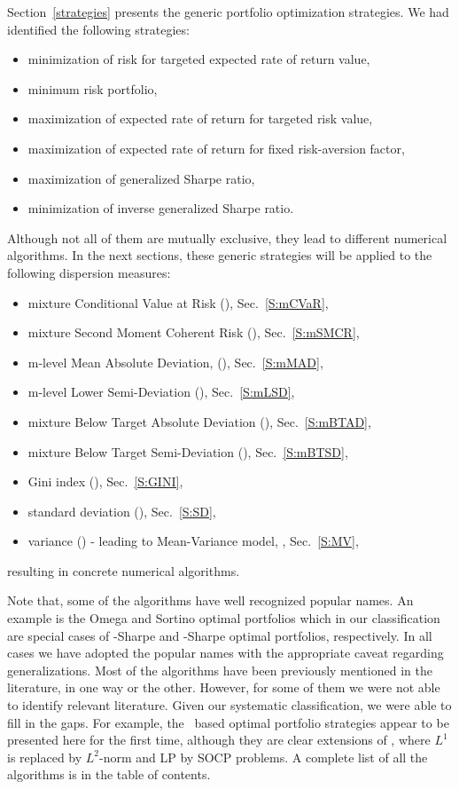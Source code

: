 Section~\ref{strategies} presents the generic portfolio optimization strategies.
We had identified the following strategies:
\begin{itemize}
  \item minimization of risk for targeted expected rate of return value,
  \item minimum risk portfolio,
  \item maximization of expected rate of return for targeted risk value,
  \item maximization of expected rate of return for fixed risk-aversion factor,
  \item maximization of generalized Sharpe ratio,
  \item minimization of inverse generalized Sharpe ratio.
\end{itemize}
Although not all of them are mutually exclusive, they lead to different numerical algorithms.
In the next sections, these generic strategies will be applied to the following dispersion measures:
\begin{itemize}
  \item mixture Conditional Value at Risk (\mCVaR),  Sec.~\ref{S:mCVaR},
  \item mixture Second Moment Coherent Risk (\mSMCR),  Sec.~\ref{S:mSMCR},
  \item m-level Mean Absolute Deviation, (\mMAD),  Sec.~\ref{S:mMAD},
  \item m-level Lower Semi-Deviation (\mLSD),  Sec.~\ref{S:mLSD},
  \item mixture Below Target Absolute Deviation (\mBTAD),  Sec.~\ref{S:mBTAD},
  \item mixture Below Target Semi-Deviation (\mBTSD),  Sec.~\ref{S:mBTSD},
  \item Gini index (\GINI),  Sec.~\ref{S:GINI},
  \item standard deviation (\SD),  Sec.~\ref{S:SD},
  \item variance (\VAR) - leading to Mean-Variance model, \MV,  Sec.~\ref{S:MV},
\end{itemize}
resulting in concrete numerical algorithms.

Note that, some of the algorithms have well recognized popular names. An example is the
Omega and Sortino optimal portfolios which in our classification are special cases
of \mBTAD-Sharpe and \mBTSD-Sharpe optimal portfolios, respectively.
In all cases we have adopted the popular names with the appropriate caveat regarding generalizations.
Most of the algorithms have been previously mentioned in the literature, in one way or the other.
However, for some of them we were not able to identify relevant literature. Given our systematic classification,
we were able to fill in the gaps. For example, the  \mLSD\ based optimal portfolio strategies appear to be presented here for the first time,
although they are clear extensions of \mMAD, where $L^1$ is replaced by $L^2$-norm and LP by SOCP problems.
A complete list of all the algorithms is in the table of contents.

